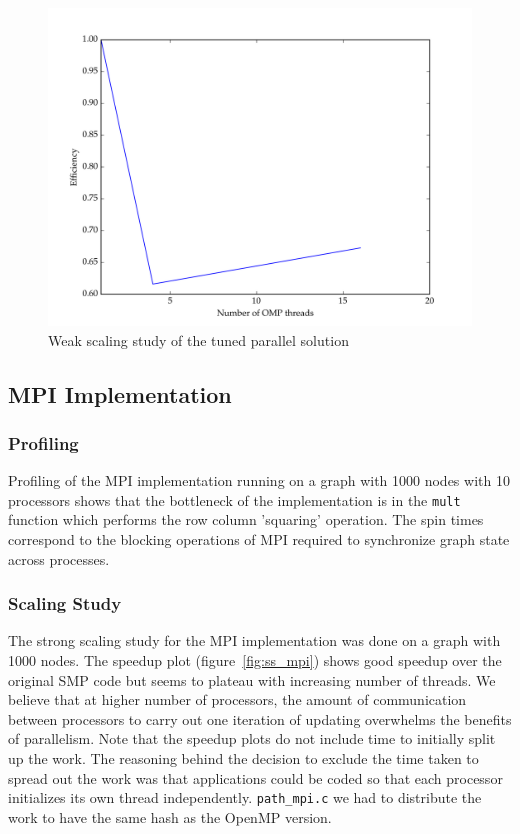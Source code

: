 \documentclass[11pt]{article}
\begin{document}
\begin{figure}[H]
\centering
\includegraphics[scale=0.5]{./scaling_studies/weak_scaling_eric.png}
\caption{Weak scaling study of the tuned parallel solution}
\label{fig:ws_eric}
\end{figure}

\subsection{MPI Implementation}

\subsubsection{Profiling}

Profiling of the MPI implementation running on a graph with 1000 nodes with 10 processors shows that the bottleneck of the implementation is in the \texttt{mult} function which performs the row column 'squaring' operation. The spin times correspond to the blocking operations of MPI required to synchronize graph state across processes. 




\subsubsection{Scaling Study}

The strong scaling study for the MPI implementation was done on a graph with 1000 nodes. The speedup plot (figure~\ref{fig:ss_mpi}) shows good speedup over the original SMP code but seems to plateau with increasing number of threads. We believe that at higher number of processors, the amount of communication between processors to carry out one iteration of updating overwhelms the benefits of parallelism. Note that the speedup plots do not include time to initially split up the work. The reasoning behind the decision to exclude the time taken to spread out the work was that applications could be coded so that each processor initializes its own thread independently. \texttt{path\_mpi.c} we had to distribute the work to have the same hash as the OpenMP version. 
\end{document}

